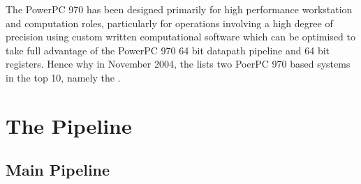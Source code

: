 \documentclass[a4paper,12pt]{article}
\begin{document}
The PowerPC 970 has been designed primarily for high performance
workstation and computation roles, particularly for operations involving
a high degree of precision using custom written computational software
which can be optimised to take full advantage of the PowerPC 970 64 bit
datapath pipeline and 64 bit registers. Hence why in November 2004, the
\cite[published list of high performance computing systems]{a11} lists
two PoerPC 970 based systems in the top 10, namely the \cite[Marenostrum
in the Barcelona Supercomputer Centre and the System X system in
Virginia Tech]{a11}.

\begin{figure}[hb]

\begin{center}


\end{center}

\caption{\cite[The IBM PowerPC 970 Microprocessor Design Layout]{a6}}

\end{figure}

\section{The Pipeline}

\subsection{Main Pipeline}
\end{document}
